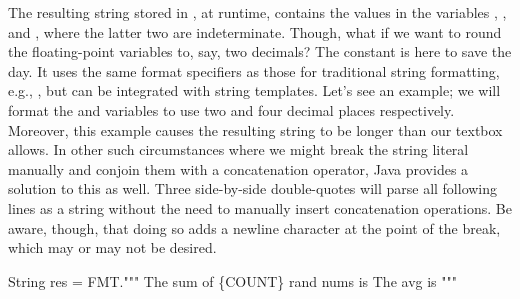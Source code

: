 \begin{verbnobox}[\small]
String res = 
  STR."The sum of \{COUNT} rand nums is \{total}. The avg is \{avg}.";
\end{verbnobox}

The resulting string stored in , at runtime, contains the values in the variables , , and , where the latter two are indeterminate. Though, what if we want to round the floating-point variables to, say, two decimals? The  constant is here to save the day. It uses the same format specifiers as those for traditional string formatting, e.g., , but can be integrated with string templates. Let's see an example; we will format the  and  variables to use two and four decimal places respectively. Moreover, this example causes the resulting string to be longer than our textbox allows. In other such circumstances where we might break the string literal manually and conjoin them with a concatenation operator, Java provides a solution to this as well. Three side-by-side double-quotes will parse all following lines as a string without the need to manually insert concatenation operations. Be aware, though, that doing so adds a newline character at the point of the break, which may or may not be desired.

\begin{verbnobox}[\small]
String res = FMT."""
  The sum of \{COUNT\} rand nums is %
  The avg is %
  """
\end{verbnobox}

